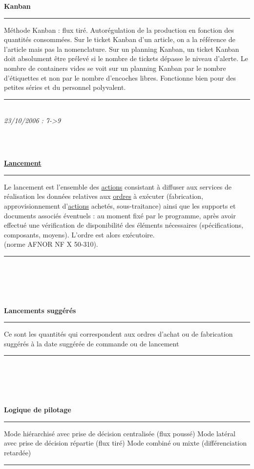 \documentclass[12pt,a4paper,twoside]{article}
\newcommand{\definition}[3]{
	\begin{minipage}{\textwidth}
		\textbf{\large{#1}}\\
		\rule{\textwidth}{0.5pt}
		#2\\
		\ifthenelse{\isempty{#3}}%
	    {}%
	    {\rule{\textwidth}{0.25pt}\\\textit{#3}}%
    \end{minipage}
    \\\\
}
\begin{document}
\definition{Kanban}
{
	Méthode Kanban : flux tiré.
	Autorégulation de la production en fonction des quantités consommées.
	Sur le ticket Kanban d'un article, on a la référence de l'article mais pas la nomenclature.
	Sur un planning Kanban, un ticket Kanban doit absolument être prélevé si le nombre de tickets dépasse le niveau d'alerte.
	Le nombre de containers vides se voit sur un planning Kanban par le nombre d'étiquettes et non par le nombre d'encoches libres.
	Fonctionne bien pour des petites séries et du personnel polyvalent.
	}{23/10/2006 : 7->9}
		
\definition{\href{http://gpr.insa-lyon.fr/supgedem/Home/Le_monde_industriel/L_entreprise/La_gestion_de_production/Le_pilotage_des_taches_et_des_ressources/le_lancement.htm}{Lancement}}
{
	Le lancement est l'ensemble des \href{http://gpr.insa-lyon.fr/supgedem/Home/glossaire/gLesactions.htm}{actions} consistant à diffuser aux services de réalisation les données relatives aux \href{http://gpr.insa-lyon.fr/supgedem/Home/Le_monde_industriel/L_entreprise/La_gestion_de_production/Le_pilotage_des_taches_et_des_ressources/lesordres.htm}{ordres} à exécuter (fabrication, approvisionnement d'\href{http://gpr.insa-lyon.fr/supgedem/Home/glossaire/gLesactions.htm}{actions} achetés, sous-traitance) ainsi que les supports et documents associés éventuels :
au moment fixé par le programme,
après avoir effectué une vérification de disponibilité des éléments nécessaires (spécifications, composants, moyens).
L'ordre est alors exécutoire.\\
(norme AFNOR NF X 50-310).
	}{}
			
\definition{Lancements suggérés}
{
	Ce sont les quantités qui correspondent aux ordres d'achat ou de fabrication suggérés à la date suggérée de commande ou de lancement
	}{}
		
\definition{Logique de pilotage}
{
	Mode hiérarchisé avec prise de décision centralisée (flux poussé)
	Mode latéral avec prise de décision répartie (flux tiré)
	Mode combiné ou mixte (différenciation retardée)
	}{}
			
\end{document}
